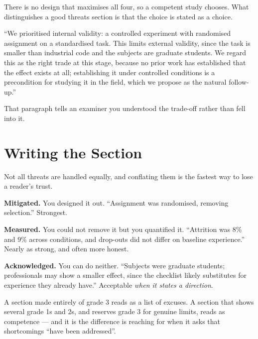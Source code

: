\begin{conceptbox}
There is no design that maximises all four, so a competent study chooses. What
distinguishes a good threats section is that the choice is stated as a choice.

\medskip
``We prioritised internal validity: a controlled experiment with randomised
assignment on a standardised task. This limits external validity, since the
task is smaller than industrial code and the subjects are graduate students. We
regard this as the right trade at this stage, because no prior work has
established that the effect exists at all; establishing it under controlled
conditions is a precondition for studying it in the field, which we propose as
the natural follow-up.''

\medskip
That paragraph tells an examiner you understood the trade-off rather than fell
into it.
\end{conceptbox}

\section{Writing the Section}

\begin{alertbox}
Not all threats are handled equally, and conflating them is the fastest way to
lose a reader's trust.

\begin{tightnum}
  \item \textbf{Mitigated.} You designed it out. ``Assignment was randomised,
    removing selection.'' Strongest.
  \item \textbf{Measured.} You could not remove it but you quantified it.
    ``Attrition was 8\% and 9\% across conditions, and drop-outs did not differ
    on baseline experience.'' Nearly as strong, and often more honest.
  \item \textbf{Acknowledged.} You can do neither. ``Subjects were graduate
    students; professionals may show a smaller effect, since the checklist
    likely substitutes for experience they already have.'' Acceptable
    \emph{when it states a direction}.
\end{tightnum}

\medskip
A section made entirely of grade 3 reads as a list of excuses. A section that
shows several grade 1s and 2s, and reserves grade 3 for genuine limits, reads
as competence --- and it is the difference  is
reaching for when it asks that shortcomings ``have been addressed''.
\end{alertbox}

